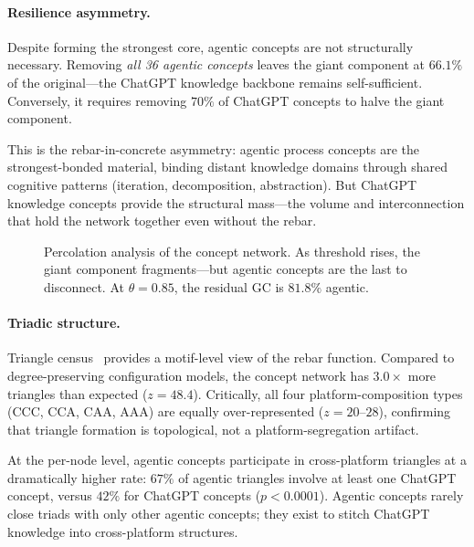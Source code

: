 \documentclass[11pt,twocolumn]{article}
\begin{document}
\paragraph{Resilience asymmetry.}
Despite forming the strongest core, agentic concepts are not structurally necessary.
Removing \emph{all 36 agentic concepts} leaves the giant component at $66.1\%$ of the original---the ChatGPT knowledge backbone remains self-sufficient.
Conversely, it requires removing $70\%$ of ChatGPT concepts to halve the giant component.

This is the rebar-in-concrete asymmetry: agentic process concepts are the strongest-bonded material, binding distant knowledge domains through shared cognitive patterns (iteration, decomposition, abstraction).
But ChatGPT knowledge concepts provide the structural mass---the volume and interconnection that hold the network together even without the rebar.

\begin{figure}[t]
  \centering
  \caption{Percolation analysis of the concept network.  As threshold rises, the giant component fragments---but agentic concepts are the last to disconnect.  At $\theta = 0.85$, the residual GC is $81.8\%$ agentic.}
  \label{fig:percolation}
\end{figure}

\paragraph{Triadic structure.}
Triangle census~\citep{milo2002network} provides a motif-level view of the rebar function.
Compared to degree-preserving configuration models, the concept network has $3.0\times$ more triangles than expected ($z = 48.4$).
Critically, all four platform-composition types (CCC, CCA, CAA, AAA) are equally over-represented ($z = 20$--$28$), confirming that triangle formation is topological, not a platform-segregation artifact.

At the per-node level, agentic concepts participate in cross-platform triangles at a dramatically higher rate: $67\%$ of agentic triangles involve at least one ChatGPT concept, versus $42\%$ for ChatGPT concepts ($p < 0.0001$).
Agentic concepts rarely close triads with only other agentic concepts; they exist to stitch ChatGPT knowledge into cross-platform structures.
\end{document}
